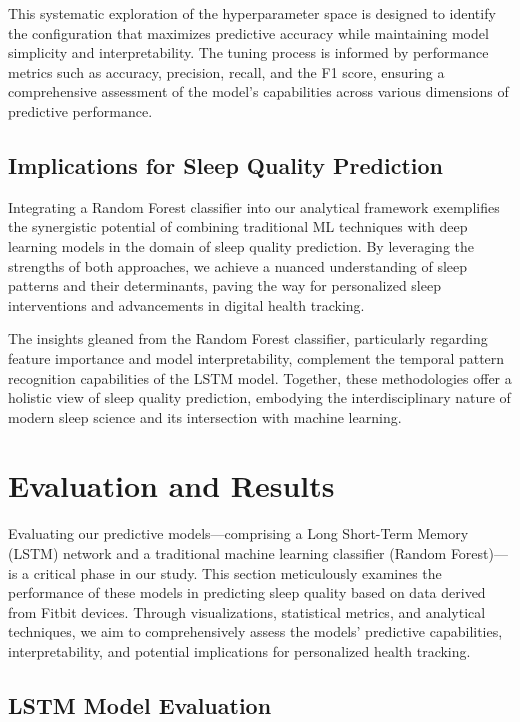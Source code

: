 \documentclass[10pt]{extarticle}
\begin{document}
This systematic exploration of the hyperparameter space is designed to identify the configuration that maximizes predictive accuracy while maintaining model simplicity and interpretability. The tuning process is informed by performance metrics such as accuracy, precision, recall, and the F1 score, ensuring a comprehensive assessment of the model's capabilities across various dimensions of predictive performance.

\subsection{Implications for Sleep Quality Prediction}

Integrating a Random Forest classifier into our analytical framework exemplifies the synergistic potential of combining traditional ML techniques with deep learning models in the domain of sleep quality prediction. By leveraging the strengths of both approaches, we achieve a nuanced understanding of sleep patterns and their determinants, paving the way for personalized sleep interventions and advancements in digital health tracking.

The insights gleaned from the Random Forest classifier, particularly regarding feature importance and model interpretability, complement the temporal pattern recognition capabilities of the LSTM model. Together, these methodologies offer a holistic view of sleep quality prediction, embodying the interdisciplinary nature of modern sleep science and its intersection with machine learning.

\section{Evaluation and Results}

Evaluating our predictive models---comprising a Long Short-Term Memory (LSTM) network and a traditional machine learning classifier (Random Forest)---is a critical phase in our study. This section meticulously examines the performance of these models in predicting sleep quality based on data derived from Fitbit devices. Through visualizations, statistical metrics, and analytical techniques, we aim to comprehensively assess the models' predictive capabilities, interpretability, and potential implications for personalized health tracking.

\subsection{LSTM Model Evaluation}
\end{document}
